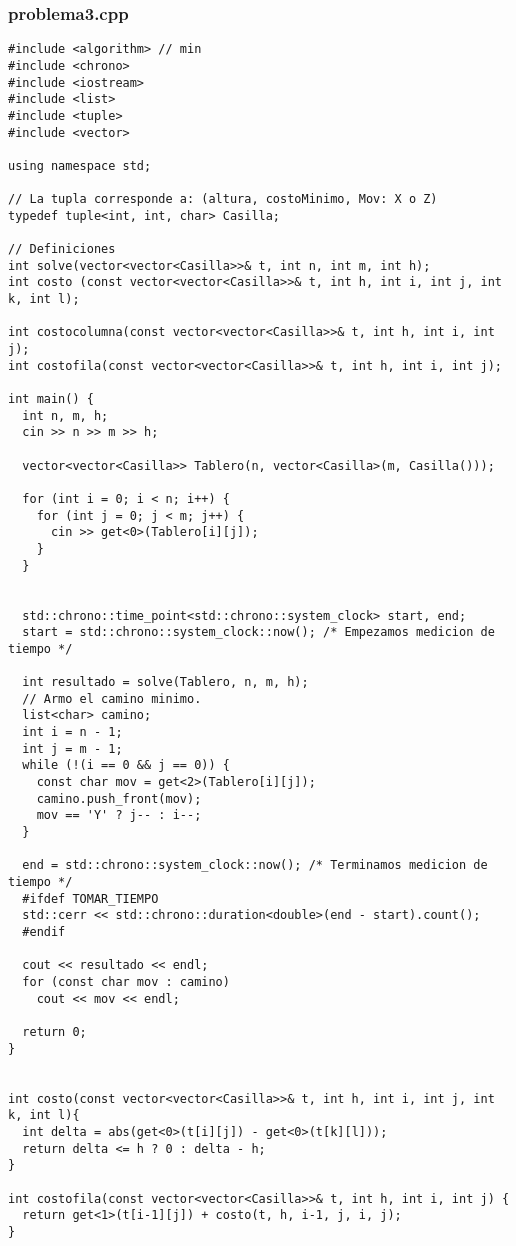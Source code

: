 \subsubsection{problema3.cpp}
\begin{lstlisting}[frame=single]
#include <algorithm> // min
#include <chrono>
#include <iostream>
#include <list>
#include <tuple>
#include <vector>

using namespace std;

// La tupla corresponde a: (altura, costoMinimo, Mov: X o Z)
typedef tuple<int, int, char> Casilla;

// Definiciones
int solve(vector<vector<Casilla>>& t, int n, int m, int h);
int costo (const vector<vector<Casilla>>& t, int h, int i, int j, int k, int l);

int costocolumna(const vector<vector<Casilla>>& t, int h, int i, int j);
int costofila(const vector<vector<Casilla>>& t, int h, int i, int j);

int main() {
  int n, m, h;
  cin >> n >> m >> h;

  vector<vector<Casilla>> Tablero(n, vector<Casilla>(m, Casilla()));

  for (int i = 0; i < n; i++) {
    for (int j = 0; j < m; j++) {
      cin >> get<0>(Tablero[i][j]);
    }
  }


  std::chrono::time_point<std::chrono::system_clock> start, end;
  start = std::chrono::system_clock::now(); /* Empezamos medicion de tiempo */

  int resultado = solve(Tablero, n, m, h);
  // Armo el camino minimo.
  list<char> camino;
  int i = n - 1;
  int j = m - 1;
  while (!(i == 0 && j == 0)) {
    const char mov = get<2>(Tablero[i][j]);
    camino.push_front(mov);
    mov == 'Y' ? j-- : i--;
  }

  end = std::chrono::system_clock::now(); /* Terminamos medicion de tiempo */
  #ifdef TOMAR_TIEMPO
  std::cerr << std::chrono::duration<double>(end - start).count();
  #endif

  cout << resultado << endl;
  for (const char mov : camino)
    cout << mov << endl;

  return 0;
}


int costo(const vector<vector<Casilla>>& t, int h, int i, int j, int k, int l){
  int delta = abs(get<0>(t[i][j]) - get<0>(t[k][l]));
  return delta <= h ? 0 : delta - h;
}

int costofila(const vector<vector<Casilla>>& t, int h, int i, int j) {
  return get<1>(t[i-1][j]) + costo(t, h, i-1, j, i, j);
}


\end{lstlisting}
